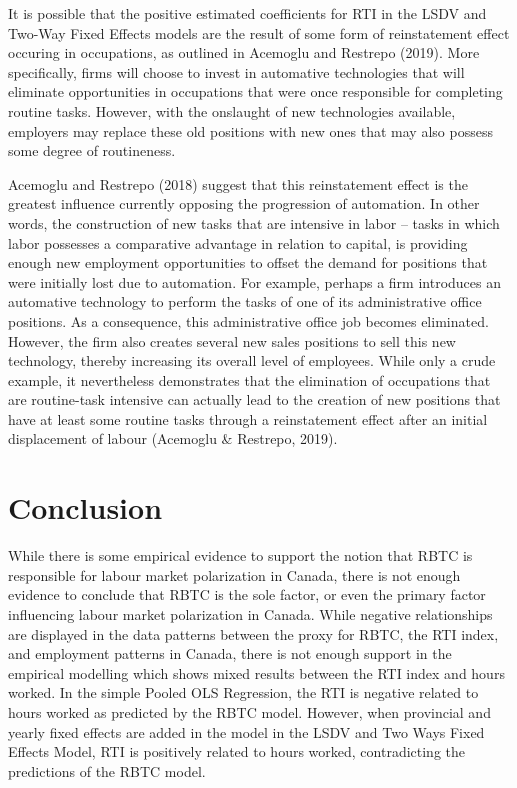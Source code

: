\documentclass[undefended]{bumrp}
\begin{document}
It is possible that the positive estimated coefficients for RTI in the LSDV and Two-Way Fixed Effects models are the result of some form of reinstatement effect occuring in occupations, as outlined in Acemoglu and Restrepo (2019).  More specifically, firms will choose to invest in automative technologies that will eliminate opportunities in occupations that were once responsible for completing routine tasks. However, with the onslaught of new technologies available, employers may replace these old positions with new ones that may also possess some degree of routineness. 

Acemoglu and Restrepo (2018) suggest that this reinstatement effect is the greatest influence currently opposing the progression of automation. In other words, the construction of new tasks that are intensive in labor – tasks in which labor possesses a comparative advantage in relation to capital, is providing enough new employment opportunities to offset the demand for positions that were initially lost due to automation. For example,  perhaps a firm introduces an automative technology to perform the tasks of one of its administrative office positions. As a consequence, this administrative office job becomes eliminated. However, the firm also creates several new sales positions to sell this new technology, thereby increasing its overall level of employees.  While only a crude example, it nevertheless demonstrates that the elimination of occupations that are routine-task intensive can actually lead to the creation of new positions that have at least some routine tasks through a reinstatement effect after an initial displacement of labour (Acemoglu \& Restrepo, 2019). 

\chapter{Conclusion}

While there is some empirical evidence to support the notion that RBTC is responsible for labour market polarization in Canada, there is not enough evidence to conclude that RBTC is the sole factor, or even the primary factor influencing labour market polarization in Canada. While negative relationships are displayed in the data patterns between the proxy for RBTC, the RTI index, and employment patterns in Canada, there is not enough support in the empirical modelling which shows mixed results between the RTI index and hours worked. In the simple Pooled OLS Regression, the RTI is negative related to hours worked as predicted by the RBTC model. However, when provincial and yearly fixed effects are added in the model in the LSDV and Two Ways Fixed Effects Model, RTI is positively related to hours worked, contradicting the predictions of the RBTC model. 
\end{document}
